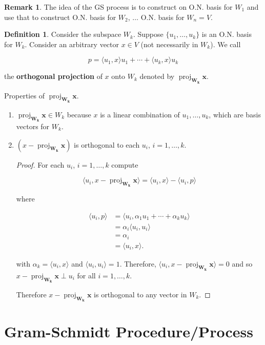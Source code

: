 \documentclass[12pt]{article}
\DeclareMathOperator{\proj}{proj}
\newcommand{\vct}{\mathbf}
\newcommand{\vctproj}[2][]{\proj_{\vct{#1}}\vct{#2}}
\theoremstyle{definition}
\newtheorem*{definition}{Definition}
\newtheorem*{remark}{Remark}
\begin{document}
\begin{remark}
The idea of the GS process is to construct on O.N. basis for $W_1$ and use that to
construct O.N. basis for $W_2$, $\ldots$ O.N. basis for $W_n = V$.
\end{remark}

\begin{definition} Consider the subspace $W_k$. Suppose $\{u_1, \ldots, u_k \}$ is
an O.N. basis for $W_k$. Consider an arbitrary vector $x \in V$ (not necessarily in
$W_k$). We call

\[ p = \langle u_1, x \rangle u_1 + \cdots + \langle u_k, x \rangle u_k \]

the \textbf{orthogonal projection} of $x$ onto $W_k$ denoted by $\vctproj[W_k]{x}$.

\end{definition}

\noindent Properties of $\vctproj[W_k]{x}$.
\begin{enumerate}[label = (\arabic*)] 
\item $\vctproj[W_k]{x} \in W_k$ because $x$ is a linear combination of $u_1, \ldots, u_k$,
which are basis vectors for $W_k$.
\item $(x - \vctproj[W_k]{x})$ is orthogonal to each $u_i$, $i = 1, \ldots, k$.
\begin{proof}
For each $u_i$, $i = 1, \ldots, k$ compute

\[ \langle u_i, x - \vctproj[W_k]{x} \rangle = \langle u_i, x \rangle - \langle u_i, p \rangle \]

where

\begin{align*}
\langle u_i , p \rangle &= \langle u_i, \alpha_1 u_1 + \cdots + \alpha_k u_k \rangle \\
&= \alpha_i \langle u_i, u_i \rangle \\
&= \alpha_i \\
&= \langle u_i, x \rangle.
\end{align*}

with $\alpha_k = \langle u_i, x \rangle$ and $\langle u_i, u_i \rangle = 1$. Therefore,
$\langle u_i, x - \vctproj[W_k]{x} \rangle = 0$ and so $x - \vctproj[W_k]{x} \perp u_i$
for all $i = 1, \ldots, k$.

Therefore $x - \vctproj[W_k]{x}$ is orthogonal to any vector in $W_k$.

\end{proof}
\end{enumerate}

\section{Gram-Schmidt Procedure/Process}
\end{document}
